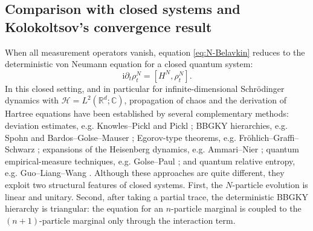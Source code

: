 \documentclass[10pt,a4paper,reqno]{amsart}
\numberwithin{equation}{section}
\theoremstyle{plain}
\theoremstyle{definition}
\theoremstyle{remark}
\renewcommand{\i}{\mathrm i}
\newcommand{\HH}{\mathcal H}
\newcommand{\1}{\mathbf 1}
\begin{document}
\subsection{Comparison with closed systems and Kolokoltsov's convergence result}
\label{subsec:difficulty-and-open-problem}


When all measurement operators vanish, equation \eqref{eq:N-Belavkin}
reduces to the deterministic von Neumann equation for a closed quantum system:
\[
  \i\partial_t\rho_t^N=[H^N,\rho_t^N].
\]
In this closed setting, and in particular for infinite-dimensional
Schr\"odinger dynamics with \(\HH=L^2(\mathbb R^d;\mathbb C)\), propagation
of chaos and the derivation of Hartree equations have been established by
several complementary methods: deviation estimates,  e.g. 
Knowles--Pickl \citep{knowlespickl2010} and Pickl \citep{pickl2011}; BBGKY
hierarchies,  e.g.  Spohn \citep{spohn1980} and
Bardos--Golse--Mauser \citep{bardos2000}; Egorov-type theorems,  e.g.  
Fr\"ohlich--Graffi--Schwarz \citep{frohlich2007}; expansions of the
Heisenberg dynamics,  e.g.   Ammari--Nier \citep{Ammari2009}; quantum
empirical-measure techniques,  e.g.  
Golse--Paul \citep{golsepaul2017,golsepaul2019}; and quantum relative
entropy,  e.g.  Guo--Liang--Wang \citep{Guo2026}.  Although these
approaches are quite different, they exploit two structural features of closed
systems.  First, the \(N\)-particle evolution is linear and unitary.  Second,
after taking a partial trace, the deterministic BBGKY hierarchy is triangular:
the equation for an \(n\)-particle marginal is coupled to the
\((n+1)\)-particle marginal only through the interaction term.
\end{document}
